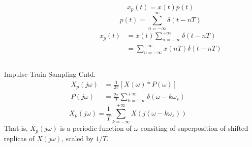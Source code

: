 \begin{frame}

    \begin{columns}
        \begin{column}{0.6\textwidth}
            {
                \pause

                
            }
        \end{column}
        \begin{column}{0.4\textwidth}
            \begin{equation*}
                x_p(t) = x(t)p(t)
            \end{equation*}
            \begin{equation*}
                p(t) = \sum_{n=-\infty}^{\infty}\delta(t-nT)
            \end{equation*}
            \begin{align*}
                x_p(t) &= x(t)\sum_{n=-\infty}^{+\infty} \delta(t - nT)\\
                &= \sum_{n=-\infty}^{+\infty} x(nT)\delta(t - nT)
            \end{align*}
        \end{column}
    \end{columns}

\end{frame}


\begin{frame}{Impulse-Train Sampling Cntd.}
    \begin{align*}
        X_p(j\omega)  &= \frac{1}{2\pi} \left[X(\omega)\ast P(\omega)\right]\\
        P(j\omega) &= \frac{2\pi}{T} \sum_{k=-\infty}^{+\infty}\delta\left(\omega- k\omega_s\right)
    \end{align*}
    \pause
    \begin{equation*}
        X_p(j\omega) = \frac{1}{T}\sum_{k=-\infty}^{+\infty} X\left(j(\omega- k\omega_s)\right)
    \end{equation*}
    \pause
    That is, $X_p(j\omega)$ is a periodic function of $\omega$ consiting of superposition of shifted replicas of $X(j\omega)$, scaled by $1/T$.
\end{frame}

